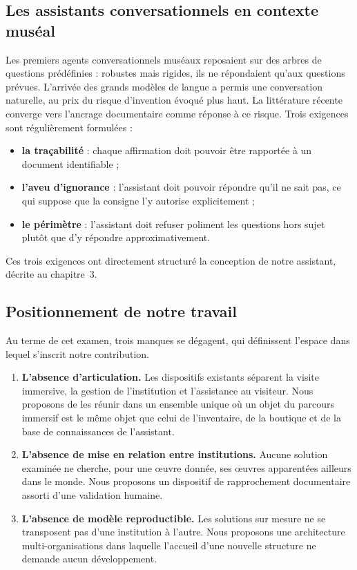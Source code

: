 \subsection{Les assistants conversationnels en contexte muséal}

Les premiers agents conversationnels muséaux reposaient sur des arbres de
questions prédéfinies : robustes mais rigides, ils ne répondaient qu'aux
questions prévues. L'arrivée des grands modèles de langue a permis une
conversation naturelle, au prix du risque d'invention évoqué plus haut. La
littérature récente converge vers l'ancrage documentaire comme réponse à ce
risque. Trois exigences sont régulièrement formulées :

\begin{itemize}
  \item \textbf{la traçabilité} : chaque affirmation doit pouvoir être rapportée
        à un document identifiable ;
  \item \textbf{l'aveu d'ignorance} : l'assistant doit pouvoir répondre qu'il ne
        sait pas, ce qui suppose que la consigne l'y autorise explicitement ;
  \item \textbf{le périmètre} : l'assistant doit refuser poliment les questions
        hors sujet plutôt que d'y répondre approximativement.
\end{itemize}

Ces trois exigences ont directement structuré la conception de notre assistant,
décrite au chapitre~3.

\subsection{Positionnement de notre travail}

Au terme de cet examen, trois manques se dégagent, qui définissent l'espace dans
lequel s'inscrit notre contribution.

\begin{enumerate}
  \item \textbf{L'absence d'articulation.} Les dispositifs existants séparent la
        visite immersive, la gestion de l'institution et l'assistance au
        visiteur. Nous proposons de les réunir dans un ensemble unique où un
        objet du parcours immersif est le même objet que celui de l'inventaire,
        de la boutique et de la base de connaissances de l'assistant.

  \item \textbf{L'absence de mise en relation entre institutions.} Aucune
        solution examinée ne cherche, pour une œuvre donnée, ses œuvres
        apparentées ailleurs dans le monde. Nous proposons un dispositif de
        rapprochement documentaire assorti d'une validation humaine.

  \item \textbf{L'absence de modèle reproductible.} Les solutions sur mesure ne
        se transposent pas d'une institution à l'autre. Nous proposons une
        architecture multi-organisations dans laquelle l'accueil d'une nouvelle
        structure ne demande aucun développement.
\end{enumerate}

